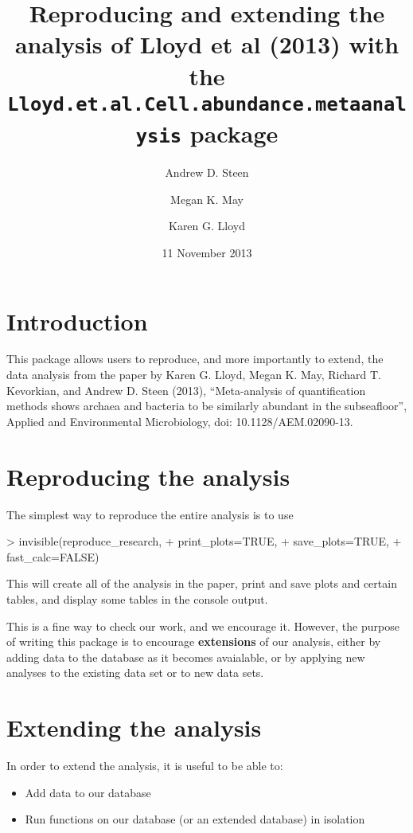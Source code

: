 \documentclass{article}
\title{Reproducing and extending the analysis of Lloyd et al (2013) with the \texttt{Lloyd.et.al.Cell.abundance.metaanalysis} package}
\author[1,2]{Andrew D. Steen}
\author[2,3,4]{Megan K. May}
\author[2]{Karen G. Lloyd}
\affil[1]{\texttt{andrew.decker.steen@gmail.com}}
\affil[2]{Department of Microbiology, University of Tennesse, Knoxville}
\affil[3]{DePauw University}
\affil[4]{Present address: Woods Hole Oceanographic Institution}
\date{11 November 2013}
\begin{document}

\maketitle

\section{Introduction}
This package allows users to reproduce, and more importantly to extend, the data analysis from the paper by Karen G. Lloyd, Megan K. May, Richard T. Kevorkian, and Andrew D. Steen (2013), ``Meta-analysis of quantification methods shows archaea and bacteria to be similarly abundant in the subseafloor'', Applied and Environmental Microbiology, doi: 10.1128/AEM.02090-13.

\section{Reproducing the analysis}

The simplest way to reproduce the entire analysis is to use

\begin{Schunk}
\begin{Sinput}
> invisible(reproduce_research, 
+           print_plots=TRUE, 
+           save_plots=TRUE, 
+           fast_calc=FALSE)
\end{Sinput}
\end{Schunk}
This will create all of the analysis in the paper, print and save plots and certain tables, and display some tables in the console output.

This is a fine way to check our work, and we encourage it. However, the purpose of writing this package is to encourage \textbf{extensions} of our analysis, either by adding data to the database as it becomes avaialable, or by applying new analyses to the existing data set or to new data sets.  

\section{Extending the analysis}
In order to extend the analysis, it is useful to be able to:

\begin{itemize}
  \item Add data to our database
  \item Run functions on our database (or an extended database) in isolation
\end{itemize}
\end{document}
